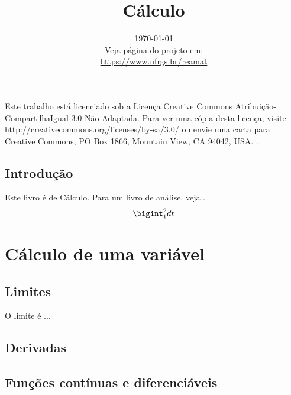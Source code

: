 \documentclass[12pt]{book}
\begin{document}
\frontmatter

\title{Cálculo}
\date{\today\vspace{1cm}\\\small{Veja página do projeto em:\\
\url{https://www.ufrgs.br/reamat}}}

\maketitle





\newpage

\par Este trabalho está licenciado sob a Licença Creative Commons Atribuição-CompartilhaIgual 3.0 Não Adaptada. Para ver uma cópia desta licença, visite http://creativecommons.org/licenses/by-sa/3.0/ ou envie uma carta para Creative Commons, PO Box 1866, Mountain View, CA 94042, USA.
.


\mainmatter

\tableofcontents
\listoffigures
\listoftables

\cleardoublepage
\chapter*{Introdução}

Este livro é de Cálculo. Para um livro de análise, veja \cite{Rudin}. $$\bigint_1^2 dt$$


\part{Cálculo de uma variável}

\chapter{Limites}
O limite é ... 
\chapter{Derivadas}

\chapter{Funções contínuas e diferenciáveis}
\end{document}
